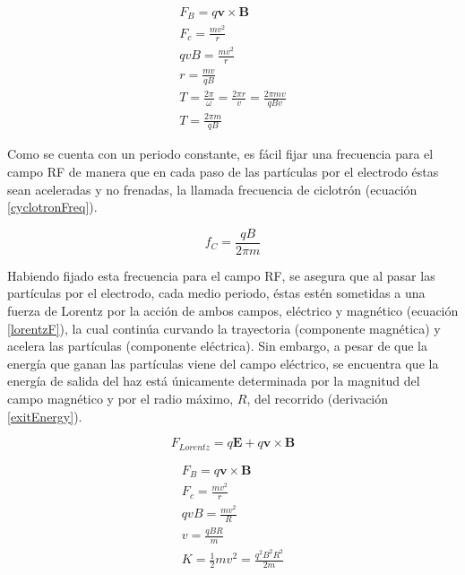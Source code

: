 \documentclass[letterpaper, 11pt]{article}
\begin{document}
\begin{multicols}{2}
\begin{equation}
\label{constantPeriod}
    \begin{gathered}
        F_B = q \textbf{v} \times \textbf{B}\\
        F_c = \frac{m v^2}{r}\\
        q v B = \frac{m v^2}{r}\\
        r = \frac{m v}{q B}\\
        T = \frac{2 \pi}{\omega} = \frac{2 \pi r}{v} = \frac{2 \pi m v}{q B v}\\
        T = \frac{2 \pi m}{q B}
    \end{gathered}
\end{equation}

Como se cuenta con un periodo constante, es fácil fijar una frecuencia para el campo RF de manera que en cada paso de las partículas por el electrodo éstas sean aceleradas y no frenadas, la llamada frecuencia de ciclotrón (ecuación \ref{cyclotronFreq}).

\begin{equation}
\label{cyclotronFreq}
    f_C = \frac{q B}{2 \pi m}
\end{equation}

Habiendo fijado esta frecuencia para el campo RF, se asegura que al pasar las partículas por el electrodo, cada medio periodo, éstas estén sometidas a una fuerza de Lorentz por la acción de ambos campos, eléctrico y magnético (ecuación \ref{lorentzF}), la cual continúa curvando la trayectoria (componente magnética) y acelera las partículas (componente eléctrica). Sin embargo, a pesar de que la energía que ganan las partículas viene del campo
eléctrico, se encuentra que la energía de salida del haz está únicamente determinada por la magnitud del campo magnético y por el radio máximo, $R$, del recorrido (derivación \ref{exitEnergy}).

\begin{equation}
\label{lorentzF}
    F_{Lorentz} = q \textbf{E} + q \textbf{v} \times \textbf{B}
\end{equation}

\begin{equation}
\label{exitEnergy}
    \begin{gathered}
        F_B = q \textbf{v} \times \textbf{B}\\
        F_c = \frac{m v^2}{r}\\
        q v B = \frac{m v^2}{R}\\
        v = \frac{q B R}{m}\\
        K = \frac{1}{2} m v^2 = \frac{q^2 B^2 R^2}{2m}
    \end{gathered}
\end{equation}


\end{multicols}
\end{document}
